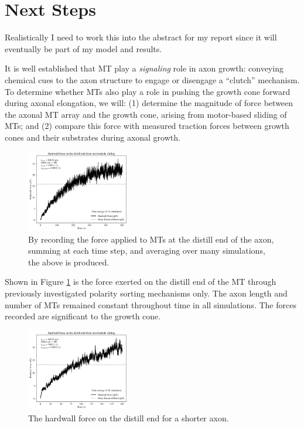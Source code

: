 \documentclass[]{biophysicist}
\begin{document}
\section{Next Steps}
Realistically I need to work this into the abstract for my report since it will eventually be part of my model and results.

It is well established that MT play a \textit{signaling} role in axon growth: conveying chemical cues to the axon structure to engage or disengage a ``clutch'' mechanism. To determine whether MTs also play a role in pushing the growth cone forward during axonal elongation, we will: (1) determine the magnitude of force between the axonal MT array and the growth cone, arising from motor-based sliding of MTs; and (2) compare this force with measured traction forces between growth cones and their substrates during axonal growth.

\begin{figure}
    \centering
    \includegraphics[width=0.4\textwidth]{figures/preliminary_force/hforce_hardwallruns3.png}
    \caption{By recording the force applied to MTs at the distill end of the axon, summing at each time step, and averaging over many simulations, the above is produced.}
    \label{fig:prelim}
\end{figure}

Shown in Figure \ref{fig:prelim} is the force exerted on the distill end of the MT through previously investigated polarity sorting mechanisms only. The axon length and number of MTs remained constant throughout time in all simulations. The forces recorded are significant to the growth cone. 

\begin{figure}
    \centering
    \includegraphics[width=0.4\textwidth]{figures/preliminary_force/hforce_hardwallrunsnonucsevlonger.png}
    \caption{The hardwall force on the distill end for a shorter axon.}
    \label{fig:long}
\end{figure}
\end{document}
